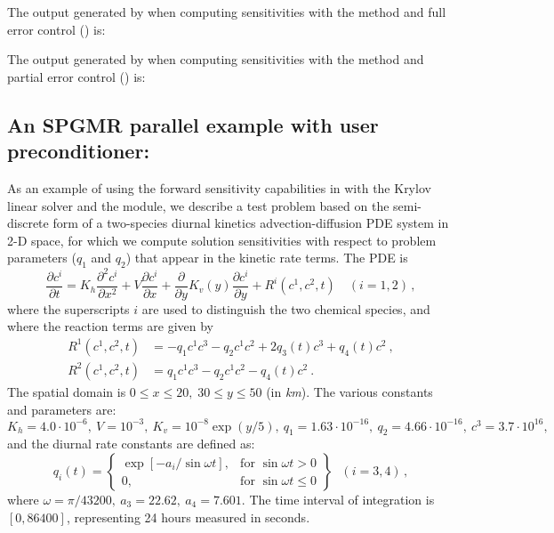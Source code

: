 The output generated by  when computing sensitivities with the 
method and full error control () is:


The output generated by  when computing sensitivities with the 
method and partial error control () is:


\newpage
\subsection{An SPGMR parallel example with user preconditioner: }
\label{ss:pvfkx}

As an example of using the forward sensitivity capabilities in {\cvodes} 
with the Krylov linear solver {\cvspgmr} and the {\nvecp} module, 
we describe a test problem based on the
semi-discrete form of a two-species diurnal kinetics advection-diffusion PDE 
system in 2-D space, for which we compute solution sensitivities with respect to 
problem parameters ($q_1$ and $q_2$) that appear in the kinetic rate terms.
The PDE is
\begin{equation}\label{e:pvfkx_PDE}
  \frac{\partial c^i}{\partial t} = K_h\frac{\partial^2 c^i}{\partial x^2}
  +V \frac{\partial c^i}{\partial x}
  + \frac{\partial} {\partial y} K_v(y) \frac{\partial c^i}{\partial y}
  + R^i(c^1,c^2,t) \quad (i=1,2) \, ,
\end{equation}
where the superscripts $i$ are used to distinguish the two chemical
species, and where the reaction terms are given by
\begin{equation}\label{e:pvfkx_R}
  \begin{split}
    R^1(c^1,c^2,t) & = -q_1c^1c^3-q_2c^1c^2+2q_3(t)c^3+q_4(t)c^2 ~, \\
    R^2(c^1,c^2,t) & = q_1c^1c^3-q_2c^1c^2-q_4(t)c^2 ~.
  \end{split}
\end{equation}
The spatial domain is $0 \leq x \leq 20,\;30 \leq y \leq 50$ (in {\em km}). 
The various constants and parameters are: $K_h=4.0\cdot 10^{-6},
~ V=10^{-3},~ K_v=10^{-8}\exp (y/5),~ q_1=1.63\cdot 10^{-16},
~ q_2=4.66\cdot 10^{-16},~ c^3=3.7\cdot 10^{16},$ and the diurnal
rate constants are defined as:
\begin{equation*}
  q_i(t) = 
  \left\{ \begin{array}{ll}
      \exp [-a_i/\sin \omega t], & \mbox{for } \sin \omega t>0 \\
      0, & \mbox{for } \sin \omega t\leq 0
    \end{array} \right\} ~~~(i=3,4) \, ,
\end{equation*}
where $\omega =\pi /43200, ~ a_3=22.62,~ a_4=7.601.$  The time interval of
integration is $[0, 86400]$, representing 24 hours measured in seconds.

